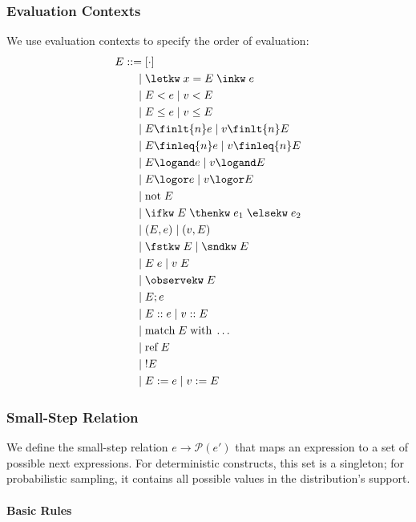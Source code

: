 \subsubsection{Evaluation Contexts}

We use evaluation contexts to specify the order of evaluation:
\begin{align*}
E ::= &\; [\cdot] \\
    | &\; \letkw \; x = E \; \inkw \; e \\
    | &\; E < e \mid v < E \\
    | &\; E \leq e \mid v \leq E \\
    | &\; E \finlt{n} e \mid v \finlt{n} E \\
    | &\; E \finleq{n} e \mid v \finleq{n} E \\
    | &\; E \logand e \mid v \logand E \\
    | &\; E \logor e \mid v \logor E \\
    | &\; \text{not}\; E \\
    | &\; \ifkw \; E \; \thenkw \; e_1 \; \elsekw \; e_2 \\
    | &\; (E, e) \mid (v, E) \\
    | &\; \fstkw \; E \mid \sndkw \; E \\
    | &\; E \; e \mid v \; E \\
    | &\; \observekw\; E \\
    | &\; E; e \\
    | &\; E :: e \mid v :: E \\
    | &\; \text{match}\; E \; \text{with}\; \ldots \\
    | &\; \text{ref}\; E \\
    | &\; !E \\
    | &\; E := e \mid v := E
\end{align*}

\subsubsection{Small-Step Relation}

We define the small-step relation $e \rightarrow \mathcal{P}(e')$ that maps an expression to a set of possible next expressions. For deterministic constructs, this set is a singleton; for probabilistic sampling, it contains all possible values in the distribution's support.

\paragraph{Basic Rules}


